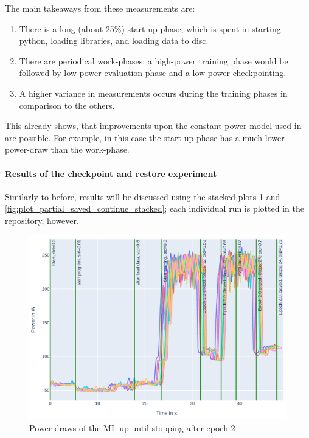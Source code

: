 The main takeaways from these measurements are:

\begin{enumerate}
    \item There is a long (about 25\%) start-up phase, which is spent in starting python, loading libraries, and loading data to disc.
    \item There are periodical work-phases; a high-power training phase would be followed by low-power evaluation phase and a low-power checkpointing.
    \item A higher variance in measurements occurs during the training phases in comparison to the others.
\end{enumerate}

This already shows, that improvements upon the constant-power model used in \cite{wiesner_lets_2021} are possible. 
For example, in this case the start-up phase has a much lower power-draw than the work-phase.

\paragraph{Results of the checkpoint and restore experiment}

Similarly to before, results will be discussed using the stacked plots \ref{fig:plot_partial_saved_stacked} and \ref{fig:plot_partial_saved_continue_stacked}; each individual run is plotted in the repository, however.

\begin{figure}
    \includegraphics[width=\linewidth]{power-measurements/stacked_plots/roberta_stop_after_saving.pdf}
    \caption{Power draws of the ML up until stopping after epoch 2}
    \label{fig:plot_partial_saved_stacked}
\end{figure}

